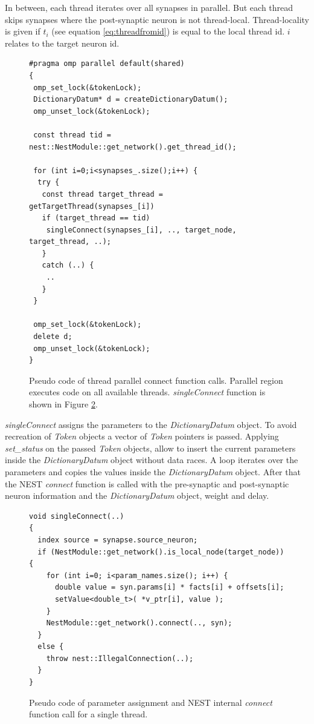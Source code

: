 In between, each thread iterates over all synapses in parallel.
But each thread skips synapses where the post-synaptic neuron is not thread-local.
Thread-locality is given if $t_i$ (see equation \ref{eq:threadfromid}) is equal to the local thread id.
$i$ relates to the target neuron id.
\begin{figure}[ht!]
\begin{lstlisting}[style=cppcode]
#pragma omp parallel default(shared)
{ 
 omp_set_lock(&tokenLock);
 DictionaryDatum* d = createDictionaryDatum();  
 omp_unset_lock(&tokenLock);

 const thread tid = nest::NestModule::get_network().get_thread_id();
      
 for (int i=0;i<synapses_.size();i++) {
  try {
   const thread target_thread = getTargetThread(synapses_[i])
   if (target_thread == tid)
    singleConnect(synapses_[i], .., target_node, target_thread, ..);
   }
   catch (..) {
    ..
   }
 }
  
 omp_set_lock(&tokenLock);
 delete d;  
 omp_unset_lock(&tokenLock);
}
\end{lstlisting}
\caption[Pseudo code of thread parallel connect function calls]{Pseudo code of thread parallel connect function calls.
Parallel region executes code on all available threads.
\emph{singleConnect} function is shown in Figure \ref{fig:singleConnect}.
}
\label{fig:iterateConnect}
\end{figure}

\emph{singleConnect} assigns the parameters to the \emph{DictionaryDatum} object.
To avoid recreation of \emph{Token} objects a vector of  \emph{Token} pointers is
passed. Applying \emph{set\_{}status} on the passed \emph{Token} objects, allow to
insert the current parameters inside the \emph{DictionaryDatum} object without data races.
A loop iterates over the parameters and copies the values inside the \emph{DictionaryDatum} object.
After that the NEST \emph{connect} function is called with the pre-synaptic and post-synaptic
neuron information and the \emph{DictionaryDatum} object, weight and delay.
\begin{figure}[ht!]
\begin{lstlisting}[style=cppcode]
void singleConnect(..)
{
  index source = synapse.source_neuron;
  if (NestModule::get_network().is_local_node(target_node)) { 
    for (int i=0; i<param_names.size(); i++) {
      double value = syn.params[i] * facts[i] + offsets[i];
      setValue<double_t>( *v_ptr[i], value );
    }
    NestModule::get_network().connect(.., syn);
  }
  else {
    throw nest::IllegalConnection(..);
  }
}
\end{lstlisting}
\caption{Pseudo code of parameter assignment and NEST internal \emph{connect} function call for a single thread.}
\label{fig:singleConnect}
\end{figure}

